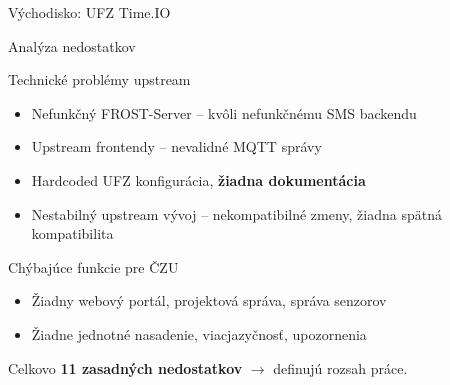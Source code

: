 \documentclass[]{beamer}
\begin{document}
\begin{frame}{Východisko: UFZ Time.IO}
\end{frame}

\begin{frame}{Analýza nedostatkov}
\begin{block}{Technické problémy upstream}
  \begin{itemize}
    \item \alert{Nefunkčný FROST-Server} – kvôli nefunkčnému SMS backendu
    \item \alert{Upstream frontendy} – nevalidné MQTT správy
    \item Hardcoded UFZ konfigurácia, \textbf{žiadna dokumentácia}
    \item Nestabilný upstream vývoj – nekompatibilné zmeny,
          žiadna spätná kompatibilita
  \end{itemize}
\end{block}
\vspace{0.3em}
\begin{block}{Chýbajúce funkcie pre ČZU}
  \begin{itemize}
    \item Žiadny webový portál, projektová správa, správa senzorov
    \item Žiadne jednotné nasadenie, viacjazyčnosť, upozornenia
  \end{itemize}
\end{block}
\vspace{0.3em}
Celkovo \textbf{11 zasadných nedostatkov} $\rightarrow$ definujú rozsah práce.
\end{frame}
\end{document}
